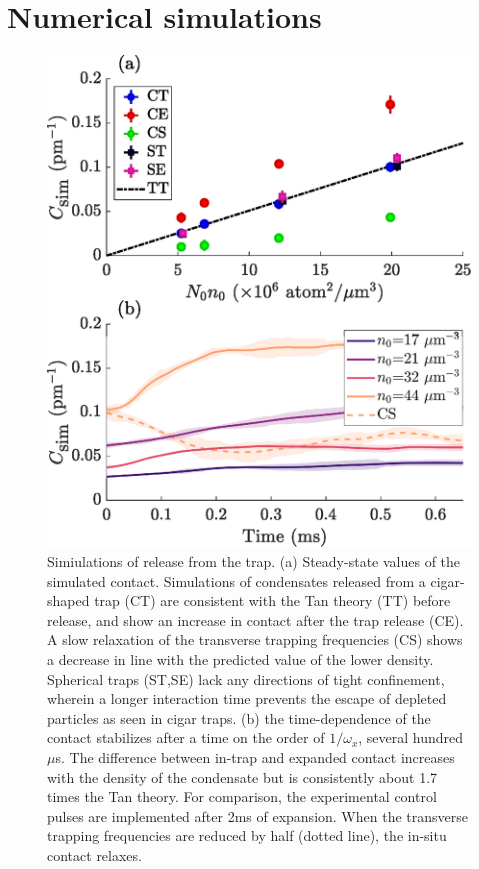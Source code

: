 \section{Numerical simulations}
\label{STAB}
	\begin{figure}
	        \includegraphics[width=\columnwidth]{fig/QD/sim_results}
	        \caption{Simiulations of release from the trap. (a) Steady-state values of the simulated contact. Simulations of condensates released from a cigar-shaped trap (CT) are consistent with the Tan theory (TT) before release, and show an increase in contact after the trap release (CE). A slow relaxation of the transverse trapping frequencies (CS) shows a decrease in line with the predicted value of the lower density. Spherical traps (ST,SE) lack any directions of tight confinement, wherein a longer interaction time prevents the escape of depleted particles as seen in cigar traps. (b) the time-dependence of the contact stabilizes after a time on the order of $1/\omega_x$, several hundred $\mu$s. The difference between in-trap and expanded contact increases with the density of the condensate but is consistently about 1.7 times the Tan theory. For comparison, the experimental control pulses are implemented after 2ms of expansion. When the transverse trapping frequencies are reduced by half (dotted line), the in-situ contact relaxes.}
	        \label{fig:sim_fig}
	\end{figure}
